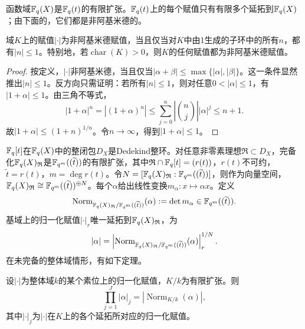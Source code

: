 \begin{note}[L9S1O4]
函数域$\mathbb{F}_q(X)$是$\mathbb{F}_q(t)$的有限扩张。$\mathbb{F}_q(t)$上的每个赋值只有有限多个延拓到$\mathbb{F}_q(X)$；由下面的，它们都是非阿基米德的。
\end{note}
\begin{lemma}\label{L9S1O5}
域$K$上的赋值$|\cdot|$为非阿基米德赋值，当且仅当对$K$中由1生成的子环中的所有$n$，都有$|n|\leq1$。特别地，若$\operatorname{char}(K)>0$，则$K$的任何赋值都为非阿基米德赋值。
\end{lemma}
\begin{proof}
按定义，$|\cdot|$非阿基米德，当且仅当$|\alpha+\beta|\leq\max\{|\alpha|,|\beta|\}$。这一条件显然推出$|n|\leq1$。反方向只需证明：若所有$|n|\leq1$，则对任意$0<|\alpha|\leq1$，有$|1+\alpha|\leq1$。由三角不等式，
\[|1+\alpha|^n=|(1+\alpha)^n|\leq\sum_{j=0}^n\left|\binom nj\right||\alpha|^j\leq n+1.\]
故$|1+\alpha|\leq(1+n)^{1/n}$。令$n\to\infty$，得到$|1+\alpha|\leq1$。
\end{proof}
$\mathbb{F}_q[t]$在$\mathbb{F}_q(X)$中的整闭包$D_X$是Dedekind整环。对任意非零素理想$\mathfrak R\subset D_X$，完备化$\mathbb{F}_q(X)_{\mathfrak R}$是$\mathbb{F}_{q^m}((\widetilde t))$的有限扩张，其中$\mathfrak R\cap\mathbb{F}_q[t]=(r(t))$，$r(t)$不可约，$\widetilde t=r(t)$，$m=\deg r(t)$。令$N=[\mathbb{F}_q(X)_{\mathfrak R}:\mathbb{F}_{q^m}((\widetilde t))]$，则作为向量空间，$\mathbb{F}_q(X)_{\mathfrak R}\cong\mathbb{F}_{q^m}((\widetilde t))^{\oplus N}$。每个$\alpha$给出线性变换$m_\alpha:x\mapsto\alpha x$。定义
\[\operatorname{Norm}_{\mathbb{F}_q(X)_{\mathfrak R}/\mathbb{F}_{q^m}((\widetilde t))}(\alpha):=\det m_\alpha\in\mathbb{F}_{q^m}((\widetilde t)).\]
基域上的归一化赋值$|\cdot|_r$唯一延拓到$\mathbb{F}_q(X)_{\mathfrak R}$，为
\[|\alpha|=\left|\operatorname{Norm}_{\mathbb{F}_q(X)_{\mathfrak R}/\mathbb{F}_{q^m}((\widetilde t))}(\alpha)\right|_r^{1/N}.\]
在未完备的整体域情形，有如下定理。
\begin{theorem}\label{L9S1O6}
设$|\cdot|$为整体域$k$的某个素位上的归一化赋值，$K/k$为有限扩张。则
\[\prod_{j=1}^J|\alpha|_j=|\operatorname{Norm}_{K/k}(\alpha)|,\]
其中$|\cdot|_j$为$|\cdot|$在$K$上的各个延拓所对应的归一化赋值。
\end{theorem}
